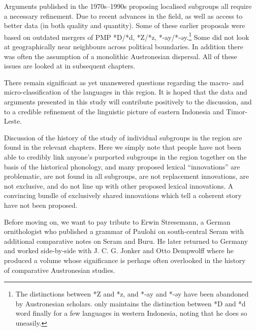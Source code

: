 {Arguments published in the 1970s--1990s proposing localised
subgroups all require a necessary refinement.
Due to recent advances in the field,
as well as access to better data (in both quality and quantity).
Some of these earlier proposals were based on outdated mergers
of PMP *D/*d, *Z/*z, *-ay/*-əy.\footnote{
		The distinctions between *Z
		and *z, and *-ay and *-əy have been abandoned by Austronesian scholars.
		\citet[582--584]{Blust2013} only maintains the distinction between *D
		and *d word finally for a few languages in western Indonesia,
		noting that he does so uneasily.}
Some did not look at geographically near neighbours across political boundaries.
In addition there was often the assumption of a monolithic Austronesian dispersal.
All of these issues are looked at in subsequent chapters.

There remain significant as yet unanswered questions
regarding the macro- and micro-classification of the languages in this region.
It is hoped that the data
and arguments presented in this study will contribute positively to the discussion,
and to a credible refinement of the linguistic picture of eastern Indonesia
and Timor-Leste.

Discussion of the history of the study of individual subgroups
in the region are found in the relevant chapters.
Here we simply note that people have not been able to credibly
link anyone’s purported subgroups in the region together
on the basis of the historical phonology,
and many proposed lexical “innovations” are problematic,
are not found in all subgroups,
are not replacement innovations, are not exclusive,
and do not line up with other proposed lexical innovations.
A convincing bundle of exclusively shared innovations
which tell a coherent story have not been proposed.

Before moving on,
we want to pay tribute to Erwin Stresemann,
a German ornithologist who published a grammar of Paulohi
on south-central Seram \citep{Stresemann1918} with additional
comparative notes on Seram and Buru.
He later returned to Germany
and worked side-by-side with J. C. G. Jonker
and Otto Dempwolff where he produced a volume
\citet{Stresemann1927} whose significance is perhaps often overlooked
in the history of comparative Austronesian studies.

}
